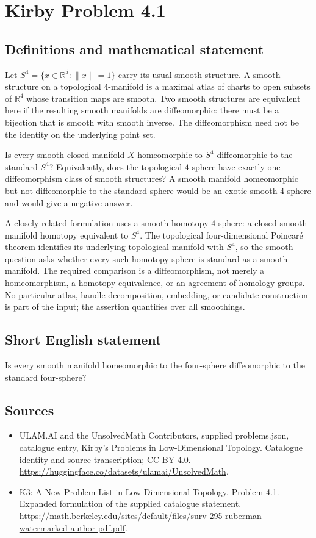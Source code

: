 \documentclass[11pt,a4paper]{article}
\begin{document}
\section*{Kirby Problem 4.1}\label{statement}

\subsection{Definitions and mathematical statement}
Let $S^4=\{x\in\mathbb R^5:\|x\|=1\}$ carry its usual smooth structure.
A smooth structure on a topological $4$-manifold is a maximal atlas
of charts to open subsets of $\mathbb R^4$ whose transition maps are
smooth. Two smooth structures are equivalent here if the resulting
smooth manifolds are diffeomorphic: there must be a bijection that is
smooth with smooth inverse. The diffeomorphism need not be the identity
on the underlying point set.

Is every smooth closed manifold $X$ homeomorphic to $S^4$ diffeomorphic
to the standard $S^4$? Equivalently, does the topological $4$-sphere
have exactly one diffeomorphism class of smooth structures?
A smooth manifold homeomorphic but not diffeomorphic to the standard
sphere would be an exotic smooth $4$-sphere and would give a negative
answer.

A closely related formulation uses a smooth homotopy $4$-sphere: a
closed smooth manifold homotopy equivalent to $S^4$. The topological
four-dimensional Poincar\'e theorem identifies its underlying topological
manifold with $S^4$, so the smooth question asks whether every such
homotopy sphere is standard as a smooth manifold.
The required comparison is a diffeomorphism, not merely a homeomorphism,
a homotopy equivalence, or an agreement of homology groups. No particular
atlas, handle decomposition, embedding, or candidate construction is
part of the input; the assertion quantifies over all smoothings.
\subsection{Short English statement}
Is every smooth manifold homeomorphic to the four-sphere diffeomorphic to the standard four-sphere?
\subsection{Sources}
\begin{itemize}
\item[S1] ULAM.AI and the UnsolvedMath Contributors, supplied problems.json, catalogue entry, Kirby's Problems in Low-Dimensional Topology. Catalogue identity and source transcription; CC BY 4.0.
\url{https://huggingface.co/datasets/ulamai/UnsolvedMath}.
\item[S2] K3: A New Problem List in Low-Dimensional Topology, Problem 4.1. Expanded formulation of the supplied catalogue statement.
\url{https://math.berkeley.edu/sites/default/files/surv-295-ruberman-watermarked-author-pdf.pdf}.
\end{itemize}
\end{document}
